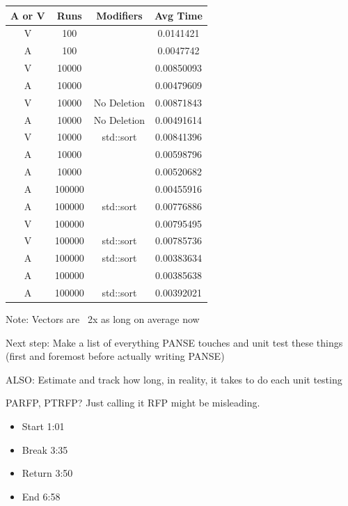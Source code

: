 \documentclass[12pt,hyperref]{labbook}
\begin{document}
\begin{table}[H]
    \centering
    \begin{tabular}{|c|c|c|c|}
        \hline
        \textbf{A or V} & \textbf{Runs} & \textbf{Modifiers} & \textbf{Avg Time} \\
        \hline
        V & 100 & & 0.0141421 \\
        A & 100 & & 0.0047742 \\
        V & 10000 & & 0.00850093 \\
        A & 10000 & & 0.00479609 \\
        V & 10000 & No Deletion & 0.00871843 \\
        A & 10000 & No Deletion & 0.00491614 \\
        V & 10000 & std::sort & 0.00841396 \\
        \hline
        A & 10000 & & 0.00598796 \\
        A & 10000 & & 0.00520682 \\
        A & 100000 & & 0.00455916 \\
        A & 100000 & std::sort & 0.00776886 \\
        V & 100000 & & 0.00795495 \\
        V & 100000 & std::sort & 0.00785736 \\
        \hline
        A & 100000 & std::sort & 0.00383634 \\
        A & 100000 & & 0.00385638 \\
        A & 100000 & std::sort & 0.00392021 \\
        \hline
    \end{tabular}
\end{table}

Note: Vectors are ~2x as long on average now


Next step: Make a list of everything PANSE touches and unit test these things (first and foremost before actually writing PANSE)

ALSO: Estimate and track how long, in reality, it takes to do each unit testing

PARFP, PTRFP? Just calling it RFP might be misleading.


\begin{itemize}
    \item Start 1:01
    \item Break 3:35
    \item Return 3:50
    \item End 6:58
\end{itemize}
\end{document}
